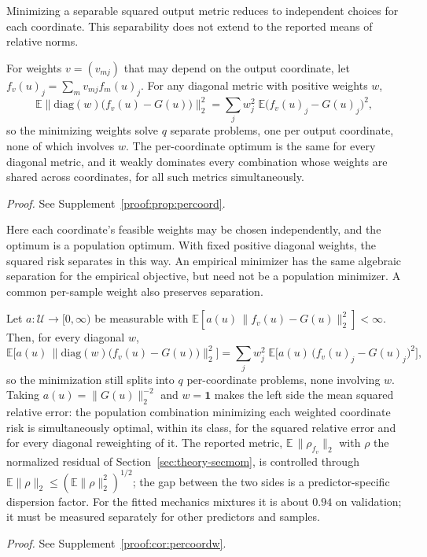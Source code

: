 Minimizing a separable squared output metric reduces to independent
choices for each coordinate. This separability does not extend to the
reported means of relative norms.

\begin{proposition}
\label{prop:percoord}
For weights $v=(v_{mj})$ that may depend on the output coordinate, let
$f_v(u)_j=\sum_m v_{mj}f_m(u)_j$. For any diagonal metric with positive
weights $w$,
\[
\mathbb E\big\|\mathrm{diag}(w)\big(f_v(u)-G(u)\big)\big\|_2^2
=\sum_j w_j^2\;\mathbb E\big(f_v(u)_j-G(u)_j\big)^2 ,
\]
so the minimizing weights solve $q$ separate problems, one per output
coordinate, none of which involves $w$. The per-coordinate optimum is the
same for every diagonal metric, and it weakly dominates every combination
whose weights are shared across coordinates, for all such metrics
simultaneously.
\end{proposition}
\noindent\emph{Proof.} See Supplement~\ref{proof:prop:percoord}.


Here each coordinate's feasible weights may be chosen independently, and
the optimum is a population optimum. With fixed positive diagonal weights,
the squared risk separates in this way. An empirical minimizer has the same
algebraic separation for the empirical objective, but need not be a
population minimizer. A common per-sample weight also preserves separation.

\begin{corollary}\label{cor:percoordw}
Let $a:\mathcal U\to[0,\infty)$ be measurable with
$\mathbb E[a(u)\,\|f_v(u)-G(u)\|_2^2]<\infty$. Then, for every diagonal $w$,
\[
\mathbb E\Big[a(u)\,\big\|\mathrm{diag}(w)\big(f_v(u)-G(u)\big)\big\|_2^2\Big]
=\sum_j w_j^2\;\mathbb E\Big[a(u)\,\big(f_v(u)_j-G(u)_j\big)^2\Big],
\]
so the minimization still splits into $q$ per-coordinate problems, none
involving $w$. Taking $a(u)=\|G(u)\|_2^{-2}$ and $w=\mathbf 1$ makes the left
side the mean squared relative error: the population combination minimizing each
weighted coordinate risk is simultaneously optimal, within its class, for the squared relative error and for every
diagonal reweighting of it. The reported metric, $\mathbb E\,\|\rho_{f_v}\|_2$
with $\rho$ the normalized residual of Section~\ref{sec:theory-secmom}, is
controlled through $\mathbb E\|\rho\|_2\le(\mathbb E\|\rho\|_2^2)^{1/2}$; the
gap between the two sides is a predictor-specific dispersion factor. For the
fitted mechanics mixtures it is about $0.94$ on validation; it must be
measured separately for other predictors and samples.
\end{corollary}
\noindent\emph{Proof.} See Supplement~\ref{proof:cor:percoordw}.


